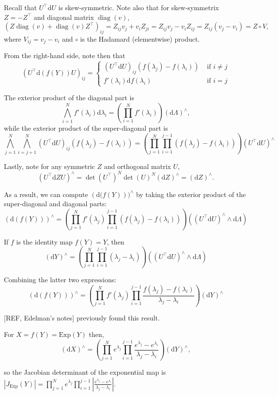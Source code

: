 \documentclass[11pt]{article}
\newcommand{\abs}[1]{\left| #1 \right|}
\newcommand{\absdet}[1]{\abs{#1}}
\newcommand{\dv}[1]{\mathrm{d}{#1}}
\newcommand{\Exp}{\mathrm{Exp}}
\begin{document}
Recall that $U^\top \dv{U}$ is skew-symmetric.
Note also that for skew-symmetrix $Z = -Z^\top$ and diagonal matrix $\operatorname{diag}(v)$,
\[(Z\operatorname{diag}(v) + \operatorname{diag}(v)Z^\top)_{ij} = Z_{ij} v_j + v_i Z_{ji} = Z_{ij} v_j - v_i Z_{ij} = Z_{ij} (v_j - v_i) = Z \circ V,\]
where $V_{ij} = v_j - v_i$ and $\circ$ is the Hadamard (elementwise) product.

From the right-hand side, note then that
\[(U^\top \dv{(f(Y))} U)_{ij} = \begin{cases} (U^\top \dv{U})_{ij} (f(\lambda_j) - f(\lambda_i)) & \text{ if } i \ne j \\ f'(\lambda_i) \dv{f(\lambda_i)} &\text{ if } i = j \end{cases}\]

The exterior product of the diagonal part is
\[
  \bigwedge_{i=1}^N f'(\lambda_i) \dv{\lambda_i} = \left(\prod_{i=1}^N f'(\lambda_i)\right) (\dv{\Lambda})^\wedge,
\]
while the exterior product of the super-diagonal part is
\[
  \bigwedge_{j=1}^N \bigwedge_{i=j+1}^N (U^\top \dv{U})_{ij} (f(\lambda_j) - f(\lambda_i)) = \left( \prod_{j=1}^N \prod_{i=1}^{j-1} (f(\lambda_j) - f(\lambda_i)) \right) \left(U^\top \dv{U} \right)^\wedge
\]

Lastly, note for any symmetric $Z$ and orthogonal matrix $U$,
\[(U^\top \dv{Z} U)^\wedge = \det(U^\top)^N \det(U)^N (\dv{Z})^\wedge = (\dv{Z})^\wedge.\]

As a result, we can compute $(\dv(f(Y)))^\wedge$ by taking the exterior product of the super-diagonal and diagonal parts: 
\[(\dv{(f(Y))})^\wedge = \left(\prod_{j=1}^N f'(\lambda_j) \prod_{i=1}^{j-1} (f(\lambda_j) - f(\lambda_i))\right) ((U^\top \dv{U})^\wedge \wedge \dv{\Lambda})\]

If $f$ is the identity map $f(Y) = Y$, then
\[ (\dv{Y})^\wedge = \left(\prod_{j=1}^N \prod_{i=1}^{j-1} (\lambda_j - \lambda_i)\right) \left((U^\top \dv{U})^\wedge \wedge \dv{\Lambda}\right)\]

Combining the latter two expressions:
\[(\dv{(f(Y))})^\wedge = \left(\prod_{j=1}^N f'(\lambda_j) \prod_{i=1}^{j-1} \frac{f(\lambda_j) - f(\lambda_i)}{\lambda_j - \lambda_i}\right) (\dv{Y})^\wedge\]

[REF, Edelman's notes] previously found this result.

For $X = f(Y) = \Exp(Y)$ then,
\[ (\dv{X})^\wedge = \left(\prod_{j=1}^N e^{\lambda_j} \prod_{i=1}^{j-1} \frac{e^{\lambda_j} - e^{\lambda_i}}{\lambda_j - \lambda_i}\right) (\dv{Y})^\wedge,\]

so the Jacobian determinant of the exponential map is $\absdet{J_{\Exp}(Y)} = \prod_{j=1}^N e^{\lambda_j} \prod_{i=1}^{j-1} \left|\frac{e^{\lambda_j} - e^{\lambda_i}}{\lambda_j - \lambda_i}\right|$.
\end{document}
